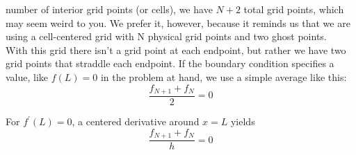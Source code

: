 number of interior grid points (or cells), we have $N +2$ total grid points, which
may seem weird to you. We prefer it, however, because it reminds us that we are
using a cell-centered grid with N physical grid points and two ghost points. \\
With this grid there isn\rq t a grid point at each endpoint, but rather we have two
grid points that straddle each endpoint. If the boundary condition specifies a
value, like $f (L) = 0 $ in the problem at hand, we use a simple average like this:
\begin{equation}\label{eq:46}
		\frac{f_{N+1} + f_N}{2}=0
				\end{equation}	

For $f^\prime (L) = 0$, a centered derivative around $x = L$ yields
\begin{equation}\label{eq:47}
		\frac{f_{N+1} + f_N}{h}=0
				\end{equation}	
